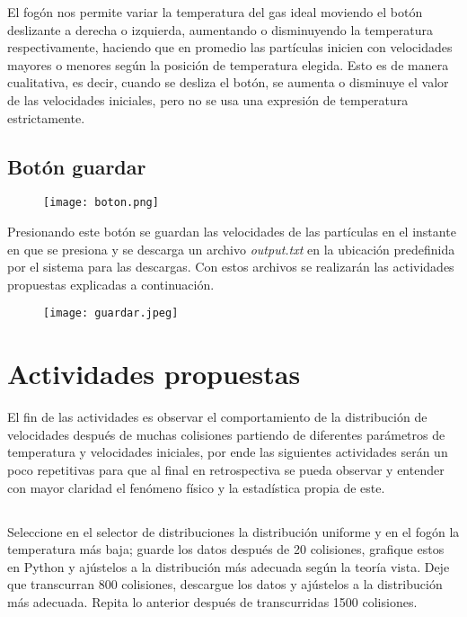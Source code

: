 \documentclass[11pt]{article}
\begin{document}
El fogón nos permite variar la temperatura del gas ideal moviendo el botón deslizante a derecha o izquierda, aumentando o disminuyendo la temperatura respectivamente, haciendo que en promedio las partículas inicien con velocidades mayores o menores según la posición de temperatura elegida. Esto es de manera cualitativa, es decir, cuando se desliza el botón, se aumenta o disminuye el valor de las velocidades iniciales, pero no se usa una expresión de temperatura estrictamente.

\subsection{Botón guardar}
\begin{figure}[H]
\centerline{\texttt{[image: boton.png]}}
\end{figure}

Presionando este botón se guardan las velocidades de las partículas en el instante en que se presiona y se descarga un archivo \textit{output.txt} en la ubicación predefinida por el sistema para las descargas. Con estos archivos se realizarán las actividades propuestas explicadas a continuación.

\begin{figure}[H]
\centerline{\texttt{[image: guardar.jpeg]}}
\end{figure}


\section{Actividades propuestas}

El fin de las actividades es observar el comportamiento de la distribución de velocidades después de muchas colisiones partiendo de diferentes parámetros de temperatura y velocidades iniciales, por ende las siguientes actividades serán un poco repetitivas para que al final en retrospectiva se pueda observar y entender con mayor claridad el fenómeno físico y la estadística propia de este.  

\subsection{}
Seleccione en el selector de distribuciones la distribución uniforme y en el fogón la temperatura más baja; guarde los datos después de 20 colisiones, grafique estos en Python y ajústelos a la distribución más adecuada según la teoría vista. Deje que transcurran 800 colisiones, descargue los datos y ajústelos a la distribución más adecuada. Repita lo anterior después de transcurridas 1500 colisiones.  
\end{document}
